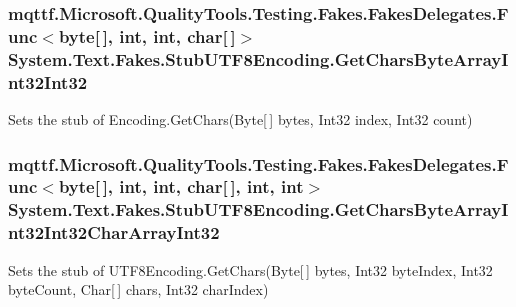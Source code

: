 \hypertarget{class_system_1_1_text_1_1_fakes_1_1_stub_u_t_f8_encoding_a0feee626b70dd71e8d37b52ce0b017c1}{
\subsubsection[{Get\-Chars\-Byte\-Array\-Int32\-Int32}]{\setlength{\rightskip}{0pt plus 5cm}mqttf.\-Microsoft.\-Quality\-Tools.\-Testing.\-Fakes.\-Fakes\-Delegates.\-Func$<$byte\mbox{[}$\,$\mbox{]}, int, int, char\mbox{[}$\,$\mbox{]}$>$ System.\-Text.\-Fakes.\-Stub\-U\-T\-F8\-Encoding.\-Get\-Chars\-Byte\-Array\-Int32\-Int32}}\label{class_system_1_1_text_1_1_fakes_1_1_stub_u_t_f8_encoding_a0feee626b70dd71e8d37b52ce0b017c1}


Sets the stub of Encoding.\-Get\-Chars(\-Byte\mbox{[}$\,$\mbox{]} bytes, Int32 index, Int32 count)

\hypertarget{class_system_1_1_text_1_1_fakes_1_1_stub_u_t_f8_encoding_a97767fc36814f5afe6ae7e359b1e42d1}{
\subsubsection[{Get\-Chars\-Byte\-Array\-Int32\-Int32\-Char\-Array\-Int32}]{\setlength{\rightskip}{0pt plus 5cm}mqttf.\-Microsoft.\-Quality\-Tools.\-Testing.\-Fakes.\-Fakes\-Delegates.\-Func$<$byte\mbox{[}$\,$\mbox{]}, int, int, char\mbox{[}$\,$\mbox{]}, int, int$>$ System.\-Text.\-Fakes.\-Stub\-U\-T\-F8\-Encoding.\-Get\-Chars\-Byte\-Array\-Int32\-Int32\-Char\-Array\-Int32}}\label{class_system_1_1_text_1_1_fakes_1_1_stub_u_t_f8_encoding_a97767fc36814f5afe6ae7e359b1e42d1}


Sets the stub of U\-T\-F8\-Encoding.\-Get\-Chars(\-Byte\mbox{[}$\,$\mbox{]} bytes, Int32 byte\-Index, Int32 byte\-Count, Char\mbox{[}$\,$\mbox{]} chars, Int32 char\-Index)


